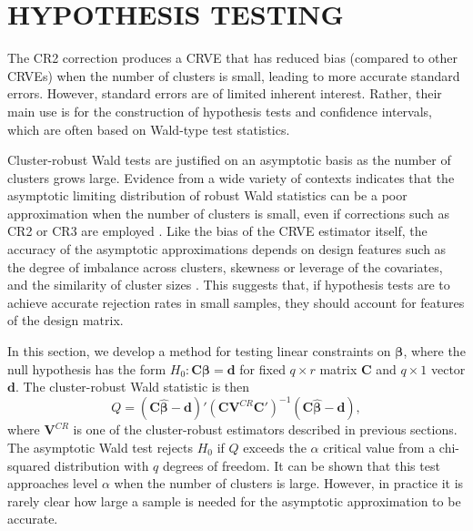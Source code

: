 \documentclass[12pt]{article}\usepackage[]{graphicx}\usepackage[]{color}
\newcommand{\bm}{\mathbf}
\newcommand{\bs}{\boldsymbol}
\begin{document}
\section{HYPOTHESIS TESTING}
\label{sec:testing}

The CR2 correction produces a CRVE that has reduced bias (compared to other CRVEs) when the number of clusters is small, leading to more accurate standard errors. However, standard errors are of limited inherent interest. Rather, their main use is for the construction of hypothesis tests and confidence intervals, which are often based on Wald-type test statistics.

Cluster-robust Wald tests are justified on an asymptotic basis as the number of clusters grows large. 
Evidence from a wide variety of contexts indicates that the asymptotic limiting distribution of robust Wald statistics can be a poor approximation when the number of clusters is small, even if corrections such as CR2 or CR3 are employed \citep{Bell2002bias, Bertrand2004how, Cameron2008bootstrap}. 
Like the bias of the CRVE estimator itself, the accuracy of the asymptotic approximations depends on design features such as the degree of imbalance across clusters, skewness or leverage of the covariates, and the similarity of cluster sizes \citep[][]{McCaffrey2001generalizations, MacKinnon2016wild, Carter2013asymptotic}. 
This suggests that, if hypothesis tests are to achieve accurate rejection rates in small samples, they should account for features of the design matrix.

In this section, we develop a method for testing linear constraints on $\bs\beta$, where the null hypothesis has the form $H_0: \bm{C}\bs\beta = \bm{d}$ for fixed $q \times r$ matrix $\bm{C}$ and $q \times 1$ vector $\bm{d}$. 
The cluster-robust Wald statistic is then
\begin{equation}
\label{eq:Wald_stat}
Q = \left(\bm{C}\bs{\hat\beta} - \bm{d}\right)'\left(\bm{C} \bm{V}^{CR} \bm{C}'\right)^{-1}\left(\bm{C}\bs{\hat\beta} - \bm{d}\right),
\end{equation}
where $\bm{V}^{CR}$ is one of the cluster-robust estimators described in previous sections. 
The asymptotic Wald test rejects $H_0$ if $Q$ exceeds the $\alpha$ critical value from a chi-squared distribution with $q$ degrees of freedom. 
It can be shown that this test approaches level $\alpha$ when the number of clusters is large. 
However, in practice it is rarely clear how large a sample is needed for the asymptotic approximation to be accurate. 
\end{document}
